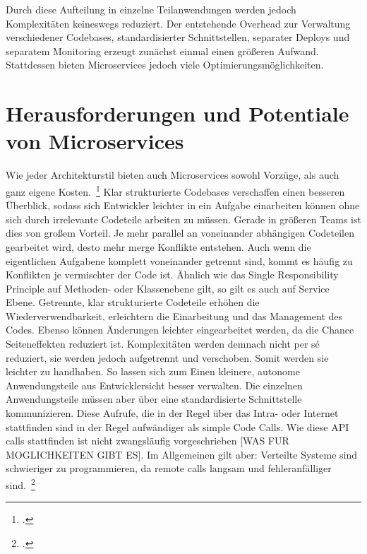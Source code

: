 Durch diese Aufteilung in einzelne Teilanwendungen werden jedoch Komplexitäten keineswegs reduziert. Der entstehende Overhead zur Verwaltung verschiedener Codebases, standardisierter Schnittstellen, separater Deploys und separatem Monitoring erzeugt zunächst einmal einen größeren Aufwand. Stattdessen bieten Microservices jedoch viele Optimierungsmöglichkeiten.

\section{Herausforderungen und Potentiale von Microservices}
Wie jeder Architekturstil bieten auch Microservices sowohl Vorzüge, als auch ganz eigene Kosten.~\footcite[vgl.][]{Fowler:Guide} 
Klar strukturierte Codebases verschaffen einen besseren Überblick, sodass sich Entwickler leichter in ein Aufgabe einarbeiten können ohne sich durch irrelevante Codeteile arbeiten zu müssen. Gerade in größeren Teams ist dies von großem Vorteil. Je mehr parallel an voneinander abhängigen Codeteilen gearbeitet wird, desto mehr merge Konflikte entstehen. Auch wenn die eigentlichen Aufgabene komplett voneinander getrennt sind, kommt es häufig zu Konflikten je vermischter der Code ist. Ähnlich wie das Single Responsibility Principle auf Methoden- oder Klassenebene gilt, so gilt es auch auf Service Ebene. Getrennte, klar strukturierte Codeteile erhöhen die Wiederverwendbarkeit, erleichtern die Einarbeitung und das Management des Codes. Ebenso können Änderungen leichter eingearbeitet werden, da die Chance Seiteneffekten reduziert ist. Komplexitäten werden demnach nicht per sé reduziert, sie werden jedoch aufgetrennt und verschoben. Somit werden sie leichter zu handhaben.
So lassen sich zum Einen kleinere, autonome Anwendungsteile aus Entwicklersicht besser verwalten. Die einzelnen Anwendungsteile müssen aber über eine standardisierte Schnittstelle kommunizieren. Diese Aufrufe, die in der Regel über das Intra- oder Internet stattfinden sind in der Regel aufwändiger als simple Code Calls. Wie diese API calls stattfinden ist nicht zwangsläufig vorgeschrieben [WAS FUR MOGLICHKEITEN GIBT ES]. Im Allgemeinen gilt aber: Verteilte Systeme sind schwieriger zu programmieren, da remote calls langsam und fehleranfälliger sind.~\footcite[vgl.][]{Fowler:Guide}

